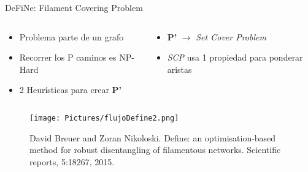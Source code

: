 \documentclass[aspectratio=169]{beamer}
\begin{document}

\begin{frame}{DeFiNe: Filament Covering Problem}
    \begin{columns}
        \begin{column}{0.55\textwidth}
            \begin{itemize}\fontsize{9pt}{5}\selectfont
                \item Problema parte de un grafo
                \item Recorrer los P caminos es NP-Hard
                \item 2 Heur\'isticas para crear {\bf P'}
            \end{itemize}        
        \end{column}
        \begin{column}{0.45\textwidth}
            \begin{itemize}\fontsize{9pt}{7.2}\selectfont
                
                \item {\bf P'} $\rightarrow$ {\it Set Cover Problem}
                \item {\it SCP} usa 1 propiedad para ponderar aristas
            \end{itemize}
        \end{column}
    \end{columns}
    \begin{figure}
        \centering
        \texttt{[image: Pictures/flujoDefine2.png]}
        \caption{David Breuer and Zoran Nikoloski. Define: an optimisation-based method for robust disentangling of filamentous networks. Scientific reports, 5:18267, 2015.}
    \end{figure}
\end{frame}
\end{document}
